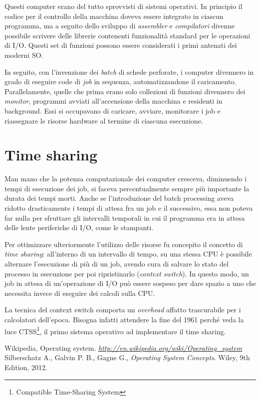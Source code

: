 \documentclass[12pt,a4paper]{report}
\begin{document}
		Questi computer erano del tutto sprovvisti di sistemi operativi. In principio il codice per il controllo della macchina doveva
		essere integrato in ciascun programma, ma a seguito dello sviluppo di \emph{assembler} e \emph{compilatori} divenne
		possibile scrivere delle librerie contenenti funzionalità standard per le operazioni di I/O.
		Questi set di funzioni possono essere considerati i primi antenati dei moderni SO.
		
		In seguito, con l'invenzione dei \emph{batch} di schede perforate, i computer divennero in grado di eseguire
		code di \emph{job} in sequenza, automatizzandone il caricamento. Parallelamente, quelle che prima erano
		solo collezioni di funzioni divennero dei \emph{monitor}, programmi avviati all'accensione della macchina e
		residenti in background. Essi si occupavano di caricare, avviare, monitorare i job e riassegnare le risorse
		hardware al termine di ciascuna esecuzione.
		
	\section{Time sharing}
		Man mano che la potenza computazionale dei computer cresceva, diminuendo i tempi di esecuzione dei job, si faceva
		percentualmente sempre più importante la durata dei tempi morti. Anche se l'introduzione del batch processing aveva
		ridotto drasticamente i tempi di attesa fra un job e il successivo, essa non poteva far nulla per sfruttare gli intervalli
		temporali in cui il programma era in attesa delle lente periferiche di I/O, come le stampanti.
		
		Per ottimizzare ulteriormente l'utilizzo delle risorse fu concepito il concetto di \emph{time sharing}: all'interno di
		un intervallo di tempo, su una stessa CPU è possibile alternare l'esecuzione di più di un job, avendo cura di
		salvare lo stato del processo in esecuzione per poi ripristinarlo (\emph{context switch}).
		In questo modo, un job in attesa di un'operazione di I/O può essere sospeso per dare spazio a uno che
		necessita invece di eseguire dei calcoli sulla CPU.
		
		La tecnica del context switch comporta un \emph{overhead} affatto trascurabile per i calcolatori dell'epoca.
		Bisogna infatti attendere la fine del 1961 perché veda la luce CTSS\footnote{Compatible Time-Sharing System},
		il primo sistema operativo ad implementare il time sharing.


\begin{thebibliography}{}
		Wikipedia, Operating system.
		\emph{\url{http://en.wikipedia.org/wiki/Operating_system}}
		Silberschatz A., Galvin P. B., Gagne G.,
		\emph{Operating System Concepts}.
		Wiley,
		9th Edition,
		2012.
\end{thebibliography}
\end{document}
